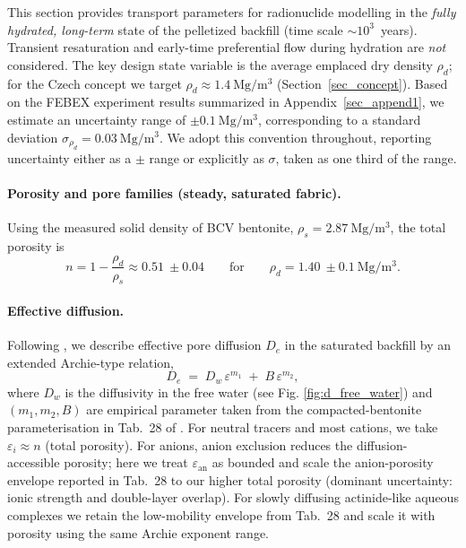 This section provides transport parameters for radionuclide modelling in the \emph{fully hydrated,
long-term} state of the pelletized backfill (time scale $\sim 10^3$~years). Transient resaturation
and early-time preferential flow during hydration are \emph{not} considered. The key design
state variable is the average emplaced dry density $\rho_d$; for the Czech concept we target
$\rho_d \approx 1.4~\mathrm{Mg/m^3}$ (Section~\ref{sec_concept}). Based on the FEBEX experiment results summarized in
Appendix~\ref{sec_append1}, we estimate an uncertainty range of $\pm 0.1~\mathrm{Mg/m^3}$, corresponding to a standard
deviation $\sigma_{\rho_d}=0.03~\mathrm{Mg/m^3}$. We adopt this convention throughout, reporting uncertainty either as a
$\pm$ range or explicitly as $\sigma$, taken as one third of the range.

\paragraph{Porosity and pore families (steady, saturated fabric).}
Using the measured solid density of BCV bentonite, $\rho_s=2.87~\mathrm{Mg/m^3}$, the total porosity is
\[
n = 1-\frac{\rho_d}{\rho_s}\approx 0.51~\pm 0.04 \qquad \text{for}\qquad \rho_d=1.40~\pm 0.1~\mathrm{Mg/m^3}.
\]

\paragraph{Effective diffusion.}
Following \cite{VanLoon2014_NTB1203}, we describe effective pore diffusion $D_{e}$ in the saturated backfill by an extended
Archie-type relation,
\[
D_{e} \;=\; D_{w}\,\varepsilon^{m_1} \;+\; B\,\varepsilon^{m_2},
\]
where $D_w$ is the diffusivity in the free water (see Fig. \ref{fig:d_free_water}) and $(m_1,m_2,B)$ are empirical parameter taken from the compacted-bentonite parameterisation in Tab.~28 of
\cite{VanLoon2014_NTB1203}. 
For neutral tracers and most cations, we take
$\varepsilon_i \approx n$ (total porosity). For anions, anion exclusion reduces the diffusion-accessible
porosity; here we treat $\varepsilon_{\mathrm{an}}$ as bounded and scale the anion-porosity envelope
reported in Tab.~28 to our higher total porosity (dominant uncertainty: ionic strength and double-layer
overlap). For slowly diffusing actinide-like aqueous complexes we retain the low-mobility envelope
from Tab.~28 and scale it with porosity using the same Archie exponent range.

